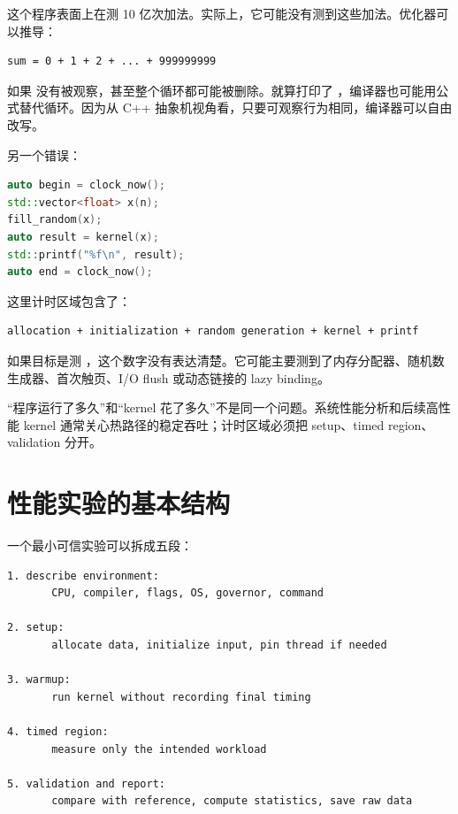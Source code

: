 这个程序表面上在测 10 亿次加法。实际上，它可能没有测到这些加法。优化器可以推导：

\begin{lstlisting}
sum = 0 + 1 + 2 + ... + 999999999
\end{lstlisting}

如果  没有被观察，甚至整个循环都可能被删除。就算打印了 ，编译器也可能用公式替代循环。因为从 C++ 抽象机视角看，只要可观察行为相同，编译器可以自由改写。

另一个错误：

\begin{lstlisting}[language=C++]
auto begin = clock_now();
std::vector<float> x(n);
fill_random(x);
auto result = kernel(x);
std::printf("%f\n", result);
auto end = clock_now();
\end{lstlisting}

这里计时区域包含了：

\begin{lstlisting}
allocation + initialization + random generation + kernel + printf
\end{lstlisting}

如果目标是测 ，这个数字没有表达清楚。它可能主要测到了内存分配器、随机数生成器、首次触页、I/O flush 或动态链接的 lazy binding。

\begin{warningbox}
“程序运行了多久”和“kernel 花了多久”不是同一个问题。系统性能分析和后续高性能 kernel 通常关心热路径的稳定吞吐；计时区域必须把 setup、timed region、validation 分开。
\end{warningbox}

\section{性能实验的基本结构}

一个最小可信实验可以拆成五段：

\begin{lstlisting}
1. describe environment:
       CPU, compiler, flags, OS, governor, command

2. setup:
       allocate data, initialize input, pin thread if needed

3. warmup:
       run kernel without recording final timing

4. timed region:
       measure only the intended workload

5. validation and report:
       compare with reference, compute statistics, save raw data
\end{lstlisting}

